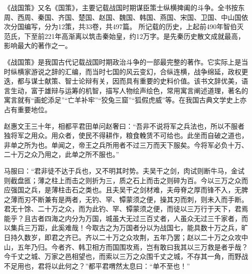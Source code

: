 \begin{conclusion}
《战国策》又名《国策》，主要记载战国时期谋臣策士纵横捭阖的斗争。全书按东周、西周、秦国、齐国、楚国、赵国、魏国、韩国、燕国、宋国、卫国、中山国依次分国编写，分为12策，共33卷，共497篇。 所记载的历史，上起前490年智伯灭范氏，下至前221年高渐离以筑击秦始皇，约12万字。是先秦历史散文成就最高，影响最大的著作之一。

《战国策》是我国古代记载战国时期政治斗争的一部最完整的著作。它实际上是当时纵横家游说之辞的汇编，而当时七国的风云变幻，合纵连横，战争绵延，政权更迭，都与谋士献策、智士论辩有关，因而具有重要的史料价值。该书文辞优美，语言生动，富于雄辩与运筹的机智，描写人物绘声绘色，常用寓言阐述道理，著名的寓言就有“画蛇添足”“亡羊补牢”“狡兔三窟”“狐假虎威”等。在我国古典文学史上亦占有重要地位。
\end{conclusion}

\begin{acknowledgements}
赵惠文王三十年，相都平君田单问赵奢曰：“吾非不说将军之兵法也，所以不服者独将军之用众。用众者，使民不得耕作，粮食輓赁不可给也。此坐而自破之道也，非单之所为也。单闻之，帝王之兵所用者不过三万而天下服矣。今将军必负十万、二十万之众乃用之，此单之所不服也。”

马服曰：“君非徒不达于兵也，又不明其时势。夫吴干之剑，肉试则断牛马，金试则截盘匜；薄之柱上而击之则折为三，质之石上而击之则碎为百。今以三万之众而应强国之兵，是薄柱击石之类也。且夫吴干之剑材难，夫毋脊之厚而锋不入，无脾之薄而刃不断兼有是两者，无钓、罕、镡蒙须之便，操其刃而刺，则未入而手断。君无十馀、二十万之众，而为此钓、罕、镡蒙须之便，而徒以三万行于天下，君焉能乎？且古者四海之内分为万国，城虽大无过三百丈者，人虽众无过三千家者，而以集兵三万距，此奚难哉！今取古之为万国者分以为战国七，能具数十万之兵，旷日持久数岁，即君之齐已。齐以二十万之众攻荆，五年乃罢；赵以二十万之众攻中山，五年乃归。今者齐、韩卫相方而国围攻焉，岂有敢曰我其以三万救是者乎哉？今千丈之城、万家之邑相望也，而索以三万之众围千丈之城，不存其一角，而野战不足用也，君将以此何之？”都平君喟然太息曰：“单不至也！”
\end{acknowledgements}
